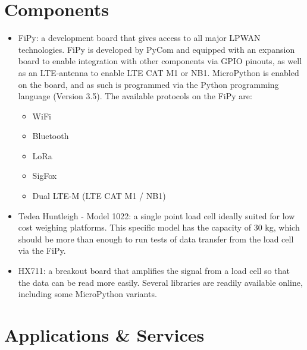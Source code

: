 \iffalse
\begin{itemize}
  \item Have a specific background or spread it out
  \item May be necessary to introduce certain things
\end{itemize}
\fi


\section{Components}
\begin{itemize}
  \item FiPy: a development board that gives access to all major LPWAN technologies. FiPy is developed by PyCom and equipped with an expansion board to enable integration with other components via GPIO pinouts, as well as an LTE-antenna to enable LTE CAT M1 or NB1. MicroPython is enabled on the board, and as such is programmed via the Python programming language (Version 3.5). The available protocols on the FiPy are:
  \begin{itemize}
    \item WiFi
    \item Bluetooth
    \item LoRa
    \item SigFox
    \item Dual LTE-M (LTE CAT M1 / NB1)
  \end{itemize}
  
  \item Tedea Huntleigh - Model 1022: a single point load cell ideally suited for low cost weighing platforms. This specific model has the capacity of 30 kg, which should be more than enough to run tests of data transfer from the load cell via the FiPy.

  \item HX711: a breakout board that amplifies the signal from a load cell so that the data can be read more easily. Several libraries are readily available online, including some MicroPython variants. 
\end{itemize}




\section{Applications \& Services}

